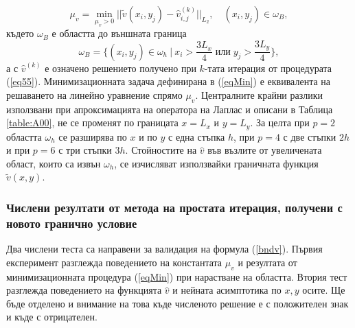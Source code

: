 \documentclass{article}
\newcommand{\be}{\begin{equation}}
\newcommand{\ee}{\end{equation}}
\newcommand{\rf}[1]{(\ref{#1})}
\theoremstyle{remark}
\begin{document}
\begin{equation}\label{eqMin}
\mu_v = \min_{ \mu_v > 0 } || \tilde v( x_i, y_j) - \widehat v^{(k)}_{i,j} ||_{L_2}, \quad (x_i, y_j) \in \omega_B ,
\end{equation}
където $\omega_B$ е областта до външната граница
\be\label{omegaB}
\omega_B = \{ (x_i, y_j) \in \omega_h \: | \: x_i > \frac{3L_x}{4} \; \textbf{или} \; y_j > \frac{3L_y}{4} \},
\ee
а с $\widehat v^{(k)}$ е означено решението получено при $k$-тата итерация от процедурата \rf{eq55}. Минимизационната задача дефинирана в \rf{eqMin} е еквивалента на решаването на линейно уравнение спрямо $\mu_v$. Централните крайни разлики използвани при апроксимацията на оператора на Лаплас и описани в Таблица \ref{table:A00}, не се променят по границата $x=L_x$ и $y=L_y$. За целта при $p=2$ областта $\omega_h$ се разширява по $x$ и по $y$ с една стъпка $h$, при $p=4$ с две стъпки $2h$ и при $p=6$ с три стъпки $3h$.
Стойностите на $\widehat v$ във възлите от увеличената област, които са извън $\omega_h$, се изчисляват използвайки граничната функция $\tilde v(x, y)$.

\subsubsection{Числени резултати от метода на простата итерация, получени с новото гранично условие}
Два числени теста са направени за валидация на формула \rf{bndv}. Първия експеримент разглежда поведението на константата $\mu_v$ и резултата от минимизационната процедура \rf{eqMin} при нарастване на областта. Втория тест разглежда поведението на функцията $\widehat v$ и нейната асимптотика по $x,y$ осите. Ще бъде отделено и внимание на това къде численото решение е с положителен знак и къде с отрицателен.
\end{document}
